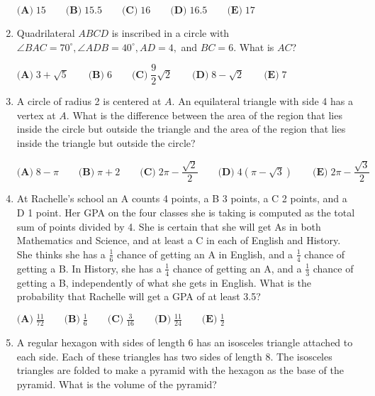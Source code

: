 \documentclass{article}
\begin{document}
\begin{enumerate}[label=\arabic*., itemsep=0.5em]
\(\textbf{(A)}\; 15 \qquad\textbf{(B)}\; 15.5 \qquad\textbf{(C)}\; 16 \qquad\textbf{(D)}\; 16.5 \qquad\textbf{(E)}\; 17\)\par \vspace{0.5em}\item Quadrilateral \(ABCD\) is inscribed in a circle with \(\angle BAC=70^{\circ}, \angle ADB=40^{\circ}, AD=4,\) and \(BC=6\). What is \(AC\)?

\(\textbf{(A)}\; 3+\sqrt{5} \qquad\textbf{(B)}\; 6 \qquad\textbf{(C)}\; \dfrac{9}{2}\sqrt{2} \qquad\textbf{(D)}\; 8-\sqrt{2} \qquad\textbf{(E)}\; 7\)\par \vspace{0.5em}\item A circle of radius 2 is centered at \(A\). An equilateral triangle with side 4 has a vertex at \(A\). What is the difference between the area of the region that lies inside the circle but outside the triangle and the area of the region that lies inside the triangle but outside the circle?

\(\textbf{(A)}\; 8-\pi \qquad\textbf{(B)}\; \pi+2 \qquad\textbf{(C)}\; 2\pi-\dfrac{\sqrt{2}}{2} \qquad\textbf{(D)}\; 4(\pi-\sqrt{3}) \qquad\textbf{(E)}\; 2\pi-\dfrac{\sqrt{3}}{2}\)\par \vspace{0.5em}\item At Rachelle's school an A counts 4 points, a B 3 points, a C 2 points, and a D 1 point. Her GPA on the four classes she is taking is computed as the total sum of points divided by 4. She is certain that she will get As in both Mathematics and Science, and at least a C in each of English and History. She thinks she has a \(\tfrac{1}{6}\) chance of getting an A in English, and a \(\tfrac{1}{4}\) chance of getting a B. In History, she has a \(\tfrac{1}{4}\) chance of getting an A, and a \(\tfrac{1}{3}\) chance of getting a B, independently of what she gets in English. What is the probability that Rachelle will get a GPA of at least 3.5?

\(\textbf{(A)}\; \frac{11}{72} \qquad\textbf{(B)}\; \frac{1}{6} \qquad\textbf{(C)}\; \frac{3}{16} \qquad\textbf{(D)}\; \frac{11}{24} \qquad\textbf{(E)}\; \frac{1}{2}\)\par \vspace{0.5em}\item A regular hexagon with sides of length 6 has an isosceles triangle attached to each side. Each of these triangles has two sides of length 8. The isosceles triangles are folded to make a pyramid with the hexagon as the base of the pyramid. What is the volume of the pyramid?


\end{enumerate}
\end{document}
